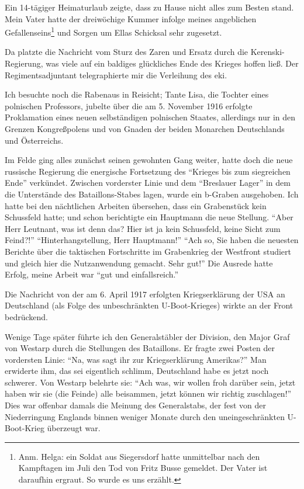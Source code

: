 \documentclass[a5paper,pagesize,10pt,twoside=true]{scrbook}
\begin{document}
Ein 14-tägiger Heimaturlaub zeigte, dass zu Hause nicht alles zum Besten stand. Mein Vater hatte der dreiwöchige Kummer infolge meines angeblichen Gefallenseins\footnote{Anm. Helga: ein Soldat aus Siegersdorf hatte unmittelbar nach den Kampftagen im Juli den Tod von Fritz Busse gemeldet. Der Vater ist daraufhin ergraut. So wurde es uns erzählt.} und Sorgen um Ellas Schicksal sehr zugesetzt.

Da platzte die Nachricht vom Sturz des Zaren und Ersatz durch die Kerenski-Regierung, was viele auf ein baldiges glückliches Ende des Krieges hoffen ließ. Der Regimentsadjuntant telegraphierte mir die Verleihung des \ac{eki}.

Ich besuchte noch die Rabenaus in Reisicht; Tante Lisa, die Tochter eines polnischen Professors, jubelte über die am 5. November 1916 erfolgte Proklamation eines neuen selbständigen polnischen Staates, allerdings nur in den Grenzen Kongreßpolens und von Gnaden der beiden Monarchen Deutschlands und Österreichs.

Im Felde ging alles zunächst seinen gewohnten Gang weiter, hatte doch die neue russische Regierung die energische Fortsetzung des \enquote{Krieges bis zum siegreichen Ende} verkündet. Zwischen vorderster Linie und dem \enquote{Breslauer Lager} in dem die Unterstände des Bataillons-Stabes lagen, wurde ein b-Graben ausgehoben. Ich hatte bei den nächtlichen Arbeiten übersehen, dass ein Grabenstück kein Schussfeld hatte; und schon berichtigte ein Hauptmann die neue Stellung. \enquote{Aber Herr Leutnant, was ist denn das? Hier ist ja kein Schussfeld, keine Sicht zum Feind?!} \enquote{Hinterhangstellung, Herr Hauptmann!} \enquote{Ach so, Sie haben die neuesten Berichte über die taktischen Fortschritte im Grabenkrieg der Westfront studiert und gleich hier die Nutzanwendung gemacht. Sehr gut!} Die Ausrede hatte Erfolg, meine Arbeit war \enquote{gut und einfallsreich.}

Die Nachricht von der am 6. April 1917 erfolgten Kriegserklärung der USA an Deutschland (als Folge des unbeschränkten U-Boot-Krieges) wirkte an der Front bedrückend.

Wenige Tage später führte ich den Generalstäbler der Division, den Major Graf von Westarp durch die Stellungen des Bataillons. Er fragte zwei Posten der vordersten Linie: \enquote{Na, was sagt ihr zur Kriegserklärung Amerikas?} Man erwiderte ihm, das sei eigentlich schlimm, Deutschland habe es jetzt noch schwerer. Von Westarp belehrte sie: \enquote{Ach was, wir wollen froh darüber sein, jetzt haben wir sie (die Feinde) alle beisammen, jetzt können wir richtig zuschlagen!} Dies war offenbar damals die Meinung des Generalstabs, der fest von der Niederringung Englands binnen weniger Monate durch den uneingeschränkten U-Boot-Krieg überzeugt war.
\end{document}
